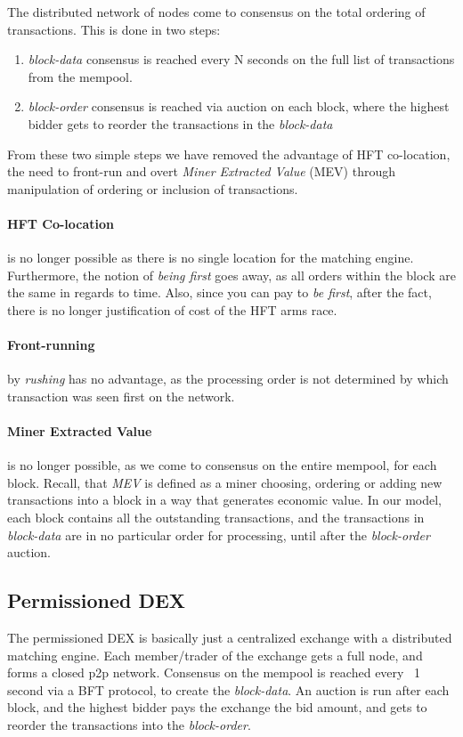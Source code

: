 \documentclass[12pt]{article}
\begin{document}
The distributed network of nodes come to consensus on the total ordering of transactions. This is done in two steps: 

\begin{enumerate}
    \item \emph{block-data} consensus is reached every N seconds on the full list of transactions from the mempool. 
    \item \emph{block-order} consensus is reached via auction on each block, where the highest bidder gets to reorder the transactions in the \emph{block-data} 
\end{enumerate}

From these two simple steps we have removed the advantage of HFT co-location, the need to front-run and overt \emph{Miner Extracted Value} (MEV) through manipulation of ordering or inclusion of transactions.

\paragraph*{HFT Co-location} is no longer possible as there is no single location for the matching engine. Furthermore, the notion of \emph{being first} goes away, as all orders within the block are the same in regards to time. Also, since you can pay to \emph{be first}, after the fact, there is no longer justification of cost of the HFT arms race. 

\paragraph*{Front-running} by \emph{rushing} has no advantage, as the processing order is not determined by which transaction was seen first on the network. 

\paragraph*{Miner Extracted Value} is no longer possible, as we come to consensus on the entire mempool, for each block. Recall, that \emph{MEV} is defined as a miner choosing, ordering or adding new transactions into a block in a way that generates economic value. In our model, each block contains all the outstanding transactions, and the transactions in \emph{block-data} are in no particular order for processing, until after the \emph{block-order} auction. 

\subsection*{Permissioned DEX}
The permissioned DEX is basically just a  centralized exchange with a distributed matching engine. Each member/trader of the exchange gets a full node, and forms a closed p2p network. Consensus on the mempool is reached every ~1 second via a BFT protocol, to create the \emph{block-data}. An auction is run after each block, and the highest bidder pays the exchange the bid amount, and gets to reorder the transactions into the \emph{block-order}. 
\end{document}
